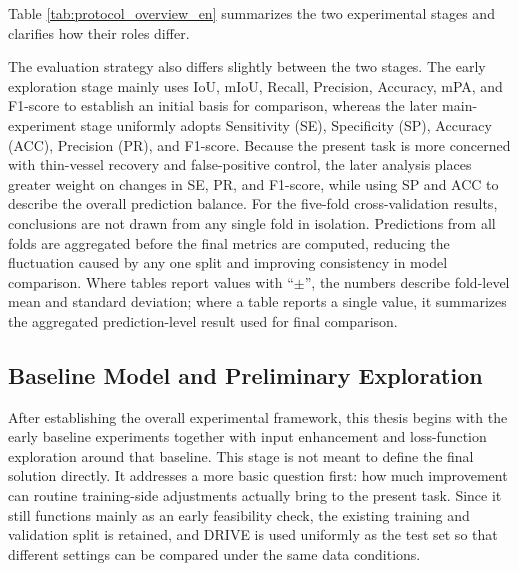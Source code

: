 \documentclass[a4paper,11pt]{article}
\begin{document}
Table \ref{tab:protocol_overview_en} summarizes the two experimental stages and clarifies how their roles differ.

\begin{table}[!htbp]
\centering
\caption{Overview of the two experimental stages}
\label{tab:protocol_overview_en}
\end{table}

The evaluation strategy also differs slightly between the two stages. The early exploration stage mainly uses IoU, mIoU, Recall, Precision, Accuracy, mPA, and F1-score to establish an initial basis for comparison, whereas the later main-experiment stage uniformly adopts Sensitivity (SE), Specificity (SP), Accuracy (ACC), Precision (PR), and F1-score. Because the present task is more concerned with thin-vessel recovery and false-positive control, the later analysis places greater weight on changes in SE, PR, and F1-score, while using SP and ACC to describe the overall prediction balance. For the five-fold cross-validation results, conclusions are not drawn from any single fold in isolation. Predictions from all folds are aggregated before the final metrics are computed, reducing the fluctuation caused by any one split and improving consistency in model comparison. Where tables report values with ``\(\pm\)'', the numbers describe fold-level mean and standard deviation; where a table reports a single value, it summarizes the aggregated prediction-level result used for final comparison.

\subsection{Baseline Model and Preliminary Exploration}
After establishing the overall experimental framework, this thesis begins with the early baseline experiments together with input enhancement and loss-function exploration around that baseline. This stage is not meant to define the final solution directly. It addresses a more basic question first: how much improvement can routine training-side adjustments actually bring to the present task. Since it still functions mainly as an early feasibility check, the existing training and validation split is retained, and DRIVE is used uniformly as the test set so that different settings can be compared under the same data conditions.
\end{document}
